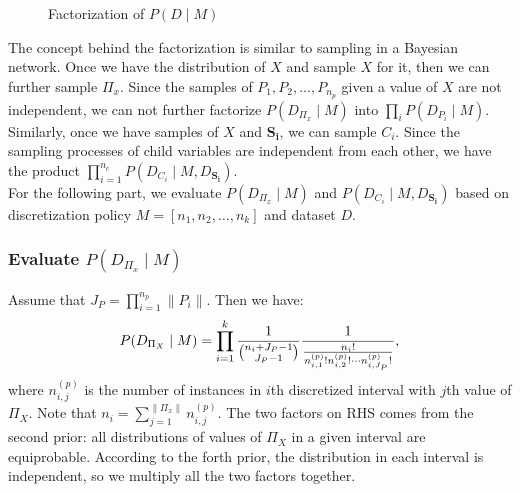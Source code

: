 \begin{figure}[ht]
    \begin{tabular}{cc}
      
    \end{tabular}
  \caption{Factorization of $P(D \mid M)$}
\end{figure}


The concept behind the factorization is similar to sampling in a Bayesian network. Once we have the distribution of $X$ and sample $X$ for it, then we can further sample $\Pi_x$. Since the samples of $P_1,P_2,\ldots,P_{n_p}$ given a value of $X$ are not independent, we can not further factorize $P(D_{\Pi_x} \mid M)$ into $\prod_i P(D_{P_i} \mid M)$. Similarly, once we have samples of $X$ and $\boldsymbol{S_i}$, we can sample $C_i$. Since the sampling processes of child variables are independent from each other, we have the product $\prod_{i = 1}^{n_c} P(D_{C_i} \mid M, D_{\boldsymbol{S_i}})$.\\

For the following part, we evaluate $P(D_{\Pi_x} \mid M)$  and $P(D_{C_i} \mid M, D_{\boldsymbol{S_i}})$ based on discretization policy $M = [n_1,n_2,\ldots,n_k]$ and dataset $D$.
\subsubsection{Evaluate $P(D_{\Pi_x} \mid M)$}
Assume that $J_P = \prod_{i=1}^{n_p} \| P_i \|$. Then we have:
\begin{equation}
P(D_{\Pi_X} \mid M) = \prod_{i=1}^k  {{1}\over{{n_i + J_P - 1}\choose{J_P -1}}}
{{1}\over{ {{{n}_i}!}\over{ {n^{(p)}_{i,1} !} {n^{(p)}_{i,2} !} \cdots {n^{(p)}_{i,J_P} !}}  }},
\end{equation}
where $n^{(p)}_{i,j}$ is the number of instances in $i$th discretized interval with $j$th value of $\Pi_X$. Note that $n_i = \sum_{j=1}^{\| \Pi_x \|} n^{(p)}_{i,j}$. The two factors on RHS comes from the second prior: all distributions of values of $\Pi_X$ in a given interval are equiprobable. According to the forth prior, the distribution in each interval is independent, so we multiply all the two factors together.
